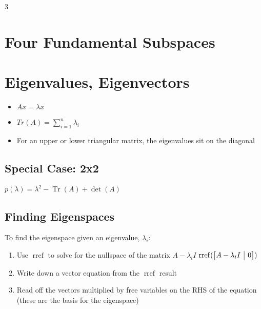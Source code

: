 \documentclass[12pt,landscape,a4paper]{article}
\makeatletter
\DeclareMathOperator{\Tr}{Tr}
\DeclareMathOperator{\rref}{rref}
\newenvironment{amatrix}[1]{%
  \left[\begin{array}{@{}*{#1}{c}|c@{}}
}{%
  \end{array}\right]
}
\makeatother
\begin{document}
\small
\begin{multicols*}{3}
  \section{Four Fundamental Subspaces}

  \section{Eigenvalues, Eigenvectors}
  \begin{itemize}
    \item $Ax = \lambda x$
    \item $Tr(A) = \sum_{i=1}^n \lambda_i$
    \item For an upper or lower triangular matrix, the eigenvalues sit on the
      diagonal


  \end{itemize}
  \subsection{Special Case: 2x2}
  $p(\lambda) = \lambda^2 - \Tr(A) + \det(A)$
  \subsection{Finding Eigenspaces}
  To find the eigenspace given an eigenvalue, $\lambda_i$:
  \begin{enumerate}
    \item Use $\rref$ to solve for the nullspace of the matrix $A-\lambda_i I$
          \begin{math}
            \rref(
              \begin{amatrix}{1}
                 A-\lambda_i I & 0
              \end{amatrix}
            )
          \end{math}
    \item Write down a vector equation from the $\rref$ result
    \item Read off the vectors multiplied by free variables on the RHS of the
      equation (these are the basis for the eigenspace)
  \end{enumerate}



\end{multicols*}
\end{document}
